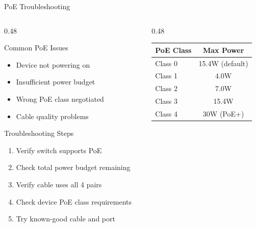 \documentclass[aspectratio=169]{beamer}  %
\begin{document}
\begin{frame}{PoE Troubleshooting}
    \begin{columns}[T]
        \begin{column}{0.48\textwidth}
            \begin{block}{Common PoE Issues}
                \begin{itemize}
                    \item Device not powering on
                    \item Insufficient power budget
                    \item Wrong PoE class negotiated
                    \item Cable quality problems
                \end{itemize}
            \end{block}
            
            \vspace{0.3em}
            \begin{block}{Troubleshooting Steps}
                \begin{enumerate}
                    \item Verify switch supports PoE
                    \item Check total power budget remaining
                    \item Verify cable uses all 4 pairs
                    \item Check device PoE class requirements
                    \item Try known-good cable and port
                \end{enumerate}
            \end{block}
        \end{column}
        \begin{column}{0.48\textwidth}
            \begin{center}
                \small
                \begin{tabular}{l c}
                    \toprule
                    \textbf{PoE Class} & \textbf{Max Power} \\
                    \midrule
                    Class 0 & 15.4W (default) \\
                    Class 1 & 4.0W \\
                    Class 2 & 7.0W \\
                    Class 3 & 15.4W \\
                    Class 4 & 30W (PoE+) \\
                    \bottomrule
                \end{tabular}
            \end{center}
            

\end{column}
\end{columns}
\end{frame}
\end{document}

